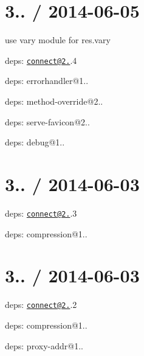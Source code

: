 {\ttfamily \section*{3.. / 2014-\/06-\/05 }}

{\ttfamily }

{\ttfamily 
\begin{DoxyItemize}
\item use {\ttfamily vary} module for {\ttfamily res.\+vary}
\item deps\+: \href{mailto:connect@2.19}{\tt connect@2.}.4
\begin{DoxyItemize}
\item deps\+: errorhandler@1..
\item deps\+: method-\/override@2..
\item deps\+: serve-\/favicon@2..
\end{DoxyItemize}
\item deps\+: debug@1..
\end{DoxyItemize}}

{\ttfamily \section*{3.. / 2014-\/06-\/03 }}

{\ttfamily }

{\ttfamily 
\begin{DoxyItemize}
\item deps\+: \href{mailto:connect@2.19}{\tt connect@2.}.3
\begin{DoxyItemize}
\item deps\+: compression@1..
\end{DoxyItemize}
\end{DoxyItemize}}

{\ttfamily \section*{3.. / 2014-\/06-\/03 }}

{\ttfamily }

{\ttfamily 
\begin{DoxyItemize}
\item deps\+: \href{mailto:connect@2.19}{\tt connect@2.}.2
\begin{DoxyItemize}
\item deps\+: compression@1..
\end{DoxyItemize}
\item deps\+: proxy-\/addr@1..
\end{DoxyItemize}}

